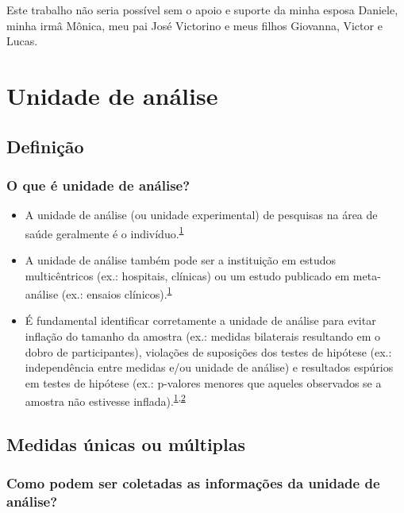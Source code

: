 \documentclass[
]{book}
\begin{document}
Este trabalho não seria possível sem o apoio e suporte da minha esposa Daniele, minha irmâ Mônica, meu pai José Victorino e meus filhos Giovanna, Victor e Lucas.

\hypertarget{unidade-analise}{%
\chapter{\texorpdfstring{\textbf{Unidade de análise}}{Unidade de análise}}\label{unidade-analise}}

\hypertarget{definicao}{%
\section{Definição}\label{definicao}}

\hypertarget{o-que-uxe9-unidade-de-anuxe1lise}{%
\subsection{O que é unidade de análise?}\label{o-que-uxe9-unidade-de-anuxe1lise}}

\begin{itemize}
\item
  A unidade de análise (ou unidade experimental) de pesquisas na área de saúde geralmente é o indivíduo.\textsuperscript{\protect\hyperlink{ref-Altman1997}{1}}
\item
  A unidade de análise também pode ser a instituição em estudos multicêntricos (ex.: hospitais, clínicas) ou um estudo publicado em meta-análise (ex.: ensaios clínicos).\textsuperscript{\protect\hyperlink{ref-Altman1997}{1}}
\item
  É fundamental identificar corretamente a unidade de análise para evitar inflação do tamanho da amostra (ex.: medidas bilaterais resultando em o dobro de participantes), violações de suposições dos testes de hipótese (ex.: independência entre medidas e/ou unidade de análise) e resultados espúrios em testes de hipótese (ex.: p-valores menores que aqueles observados se a amostra não estivesse inflada).\textsuperscript{\protect\hyperlink{ref-Altman1997}{1},\protect\hyperlink{ref-Matthews1990}{2}}
\end{itemize}

\hypertarget{medidas}{%
\section{Medidas únicas ou múltiplas}\label{medidas}}

\hypertarget{como-podem-ser-coletadas-as-informauxe7uxf5es-da-unidade-de-anuxe1lise}{%
\subsection{Como podem ser coletadas as informações da unidade de análise?}\label{como-podem-ser-coletadas-as-informauxe7uxf5es-da-unidade-de-anuxe1lise}}
\end{document}
